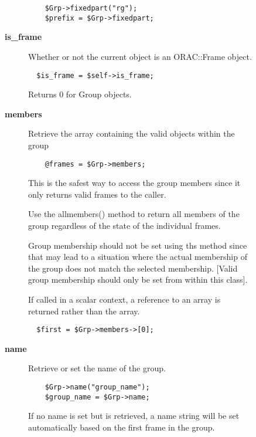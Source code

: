 \begin{description}
\begin{description}
\begin{description}
\begin{verbatim}
    $Grp->fixedpart("rg");
    $prefix = $Grp->fixedpart;
\end{verbatim}

\item[{\textbf{is\_frame}}] \mbox{}

Whether or not the current object is an ORAC::Frame object.

\begin{verbatim}
  $is_frame = $self->is_frame;
\end{verbatim}


Returns 0 for Group objects.


\item[{\textbf{members}}] \mbox{}

Retrieve the array containing the valid objects within the group

\begin{verbatim}
    @frames = $Grp->members;
\end{verbatim}


This is the safest way to access the group members
since it only returns valid frames to the caller.



Use the allmembers() method to return all members of the group
regardless of the state of the individual frames.



Group membership should not be set using ths method since that may lead
to a situation where the actual membership of the group does not match the
selected membership. [Valid group membership should only be set from
within this class].



If called in a scalar context, a reference to an array is returned
rather than the array.

\begin{verbatim}
  $first = $Grp->members->[0];
\end{verbatim}

\item[{\textbf{name}}] \mbox{}

Retrieve or set the name of the group.

\begin{verbatim}
    $Grp->name("group_name");
    $group_name = $Grp->name;
\end{verbatim}


If no name is set but is retrieved, a name string will be
set automatically based on the first frame in the group.



\end{description}
\end{description}
\end{description}
